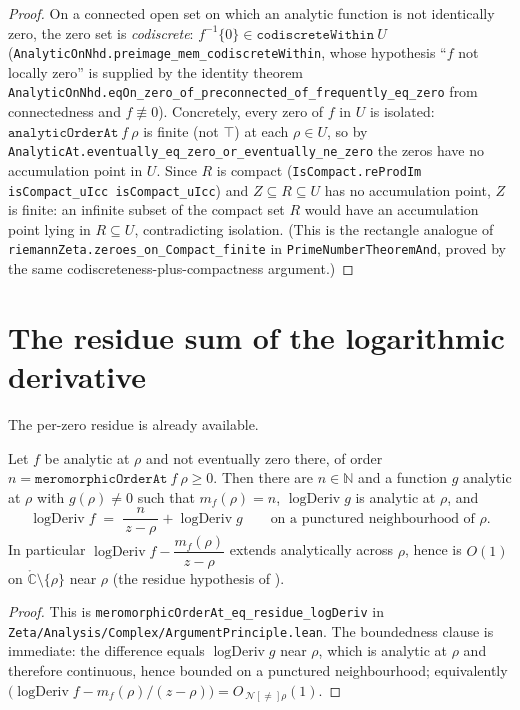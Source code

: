 \begin{proof}
\leanok
On a connected open set on which an analytic function is not identically zero, the
zero set is \emph{codiscrete}: $f^{-1}\{0\}\in\texttt{codiscreteWithin}\ U$
(\texttt{AnalyticOnNhd.preimage\_mem\_codiscreteWithin}, whose hypothesis ``$f$ not
locally zero'' is supplied by the identity theorem
\texttt{AnalyticOnNhd.eqOn\_zero\_of\_preconnected\_of\_frequently\_eq\_zero} from
connectedness and $f\not\equiv0$). Concretely, every zero of $f$ in $U$ is isolated:
$\texttt{analyticOrderAt}\ f\ \rho$ is finite (not $\top$) at each $\rho\in U$, so by
\texttt{AnalyticAt.eventually\_eq\_zero\_or\_eventually\_ne\_zero} the zeros have no
accumulation point in $U$. Since $R$ is compact
(\texttt{IsCompact.reProdIm isCompact\_uIcc isCompact\_uIcc}) and $Z\subseteq R\subseteq U$
has no accumulation point, $Z$ is finite: an infinite subset of the compact set $R$
would have an accumulation point lying in $R\subseteq U$, contradicting isolation.
(This is the rectangle analogue of \texttt{riemannZeta.zeroes\_on\_Compact\_finite}
in \texttt{PrimeNumberTheoremAnd}, proved by the same codiscreteness-plus-compactness
argument.)
\end{proof}

\section{The residue sum of the logarithmic derivative}
\label{sec:ap_residue_sum}

The per-zero residue is already available.

\begin{lemma}
\label{lem:ap_logderiv_residue}
\leanok
Let $f$ be analytic at $\rho$ and not eventually zero there, of order
$n=\texttt{meromorphicOrderAt}\ f\ \rho\ge0$. Then there are $n\in\mathbb N$ and a
function $g$ analytic at $\rho$ with $g(\rho)\neq0$ such that $m_f(\rho)=n$,
$\operatorname{logDeriv} g$ is analytic at $\rho$, and
\[
  \operatorname{logDeriv} f \;=\; \frac{n}{\,z-\rho\,} + \operatorname{logDeriv} g
  \qquad\text{on a punctured neighbourhood of }\rho .
\]
In particular $\operatorname{logDeriv} f - \dfrac{m_f(\rho)}{\,z-\rho\,}$ extends
analytically across $\rho$, hence is $O(1)$ on $\mathring{\mathbb C}\!\setminus\!\{\rho\}$
near $\rho$ (the residue hypothesis of ).
\end{lemma}

\begin{proof}\leanok
This is \texttt{meromorphicOrderAt\_eq\_residue\_logDeriv} in
\texttt{Zeta/Analysis/Complex/ArgumentPrinciple.lean}. The boundedness clause
is immediate: the difference equals $\operatorname{logDeriv} g$ near $\rho$, which is
analytic at $\rho$ and therefore continuous, hence bounded on a punctured
neighbourhood; equivalently $\bigl(\operatorname{logDeriv} f-m_f(\rho)/(z-\rho)\bigr)
=O_{\,\mathcal N[\neq]\rho}(1)$.
\end{proof}

